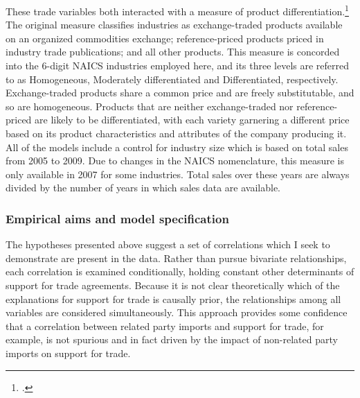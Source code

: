 \documentclass[hidelinks,12pt,letter]{article}
\begin{document}
These trade variables both interacted with a measure of product differentiation.\footnote{\cite{rauch1999networks}.} The original measure classifies industries as exchange-traded products available on an organized commodities exchange; reference-priced products priced in industry trade publications; and all other products. This measure is concorded into the 6-digit NAICS industries employed here, and its three levels are referred to as Homogeneous, Moderately differentiated and Differentiated, respectively. Exchange-traded products share a common price and are freely substitutable, and so are homogeneous. Products that are neither exchange-traded nor reference-priced are likely to be differentiated, with each variety garnering a different price based on its product characteristics and attributes of the company producing it. All of the models include a control for industry size which is based on total sales from 2005 to 2009. Due to changes in the NAICS nomenclature, this measure is only available in 2007 for some industries. Total sales over these years are always divided by the number of years in which sales data are available. 

\subsubsection*{Empirical aims and model specification}
The hypotheses presented above suggest a set of correlations which I seek to demonstrate are present in the data. Rather than pursue bivariate relationships, each correlation is examined conditionally, holding constant other determinants of support for trade agreements. Because it is not clear theoretically which of the explanations for support for trade is causally prior, the relationships among all variables are considered simultaneously. This approach provides some confidence that a correlation between related party imports and support for trade, for example, is not spurious and in fact driven by the impact of non-related party imports on support for trade. %
\end{document}
